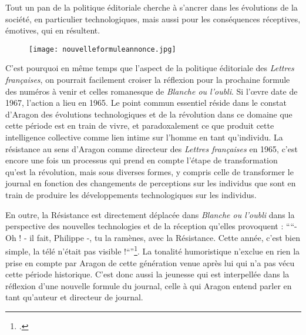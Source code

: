 	Tout un pan de la politique éditoriale cherche à s’ancrer dans les évolutions de la société, en particulier technologiques, mais aussi pour les conséquences réceptives, émotives, qui en résultent.

\begin{figure}[H]
   \centering
   \texttt{[image: nouvelleformuleannonce.jpg]}
	\caption{\cite{nouvelleformule}}\label{fig:annoncenvformule}
\end{figure}


	C’est pourquoi en même temps que l’aspect de la politique éditoriale des \emph{Lettres françaises}, on pourrait facilement croiser la réflexion pour la prochaine formule des numéros à venir et celles romanesque de \emph{Blanche ou l’oubli}. Si l'\oe{}vre date de 1967, l’action a lieu en 1965. Le point commun essentiel réside dans le constat d’Aragon des évolutions technologiques et de la révolution dans ce domaine que cette période est en train de vivre, et paradoxalement ce que produit cette intelligence collective comme lien intime sur l’homme en tant qu’individu. La résistance au sens d’Aragon comme directeur des \emph{Lettres françaises} en 1965, c’est encore une fois un processus qui prend en compte l’étape de transformation qu’est la révolution, mais sous diverses formes, y compris celle de transformer le journal en fonction des changements de perceptions sur les individus que sont en train de produire les développements technologiques sur les individus.

	 En outre, la Résistance est directement déplacée dans \emph{Blanche ou l’oubli} dans la perspective des nouvelles technologies et de la réception qu’elles provoquent : \enquote{“- Oh ! - il fait, Philippe -, tu la ramènes, avec la Résistance. Cette année, c’est bien simple, la télé n’était pas visible !“}\footcite[p134]{blancheouloubli}. La tonalité humoristique n’exclue en rien la prise en compte par Aragon de cette génération venue après lui qui n’a pas vécu cette période historique. C’est donc aussi la jeunesse qui est interpellée dans la réflexion d’une nouvelle formule du journal, celle à qui Aragon entend parler en tant qu’auteur et directeur de journal. 

